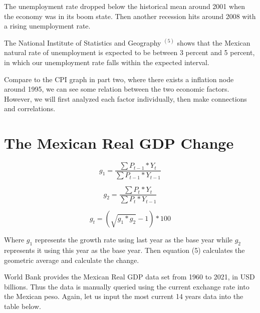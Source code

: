 \documentclass{article}
\begin{document}
    {The unemployment rate dropped below the historical mean around 2001 when the economy was in its boom state. Then another recession hits around 2008 with a rising unemployment rate.}

    {The National Institute of Statistics and Geography $^(5)$ shows that the Mexican natural rate of unemployment is expected to be between 3 percent and 5 percent, in which our unemployment rate falls within the expected interval.}

    {Compare to the CPI graph in part two, where there exists a inflation node around 1995, we can see some relation between the two economic factors. However, we will first analyzed each factor individually, then make connections and correlations.}


\section{The Mexican Real GDP Change}


    \begin{equation}
        g_1 = \frac{\sum P_{t-1} * Y_t}{\sum P_{t-1} * Y_{t-1}}
    \end{equation}

    \begin{equation}
        g_2 = \frac{\sum P_t * Y_t}{\sum P_t * Y_{t-1}}
    \end{equation}

    \begin{equation}
        g_{t} = (\sqrt{g_1 * g_2} - 1) * 100
    \end{equation}

    {Where $g_1$ represents the growth rate using last year as the base year while $g_2$ represents it using this year as the base year. Then equation (5) calculates the geometric average and calculate the change.}

    {World Bank provides the Mexican Real GDP data set from 1960 to 2021, in USD billions. Thus the data is manually queried using the current exchange rate into the Mexican peso. Again, let us input the most current 14 years data into the table below.}
\end{document}
